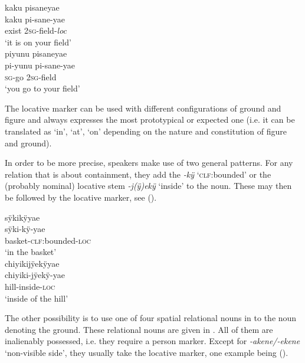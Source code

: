 \ea\label{ex:Sketch-LOC-PlGo}
  \ea
\begingl
\glpreamble kaku pisaneyae\\
\gla kaku pi-sane-yae\\
\glb exist 2\textsc{sg}-field-\textit{loc}\\
\glft ‘it is on your field’\\
\endgl
  \ex
\begingl
\glpreamble piyunu pisaneyae\\
\gla pi-yunu pi-sane-yae\\
\textsc{sg}-go 2\textsc{sg}-field\\
\glft ‘you go to your field’\\
\endgl
\z
\xe


The locative marker can be used with different configurations of ground and figure and always expresses the most prototypical or expected one (i.e. it can be translated as ‘in’, ‘at’, ‘on’ depending on the nature and constitution of figure and ground).

In order to be more precise, speakers make use of two general patterns. For any relation that is about containment, they add the  \textit{-kÿ} ‘\textsc{clf:}bounded’ or the (probably nominal) locative stem \textit{-j(ÿ)ekÿ} ‘inside’ to the noun. These may then be followed by the locative marker, see ().

\ea\label{ex:Sketch-inside-Loc}
  \ea
\begingl
\glpreamble sÿkikÿyae\\
\gla sÿki-kÿ-yae\\
\glb basket-\textsc{clf:}bounded-\textsc{loc}\\
\glft ‘in the basket’\\
\endgl
  \ex
\begingl
\glpreamble chiyikijÿekÿyae\\
\gla chiyiki-jÿekÿ-yae\\
\glb hill-inside-\textsc{loc}\\
\glft ‘inside of the hill’\\
\endgl
\z
\xe

The other possibility is to use one of four spatial relational nouns in  to the noun denoting the ground. These relational nouns are given in . All of them are inalienably possessed, i.e. they require a person marker. Except for \textit{-akene/\--ekene} ‘non-visible side’, they usually take the locative marker, one example being ().

